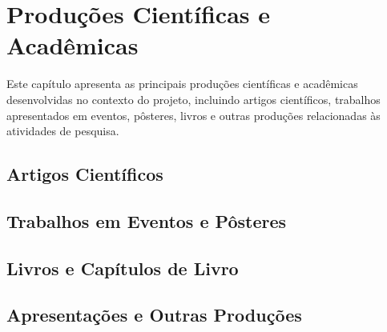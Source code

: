 \chapter{Produções Científicas e Acadêmicas}
\label{cap:Producoes_Cientificas}

Este capítulo apresenta as principais produções científicas e acadêmicas
desenvolvidas no contexto do projeto, incluindo artigos científicos,
trabalhos apresentados em eventos, pôsteres, livros e outras produções
relacionadas às atividades de pesquisa.

\section{Artigos Científicos}

\section{Trabalhos em Eventos e Pôsteres}

\section{Livros e Capítulos de Livro}

\section{Apresentações e Outras Produções}
